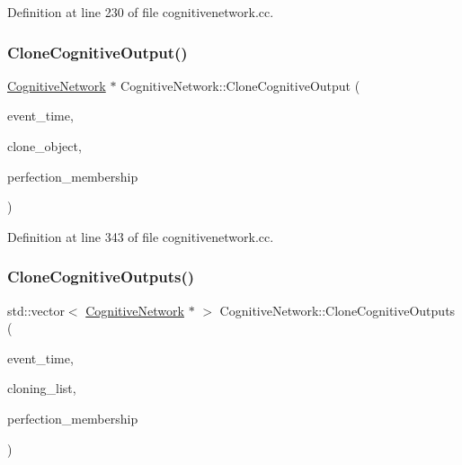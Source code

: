 Definition at line 230 of file cognitivenetwork.\+cc.

\mbox{\label{class_cognitive_network_ab24f74115c11275f365245a4bb826c91}} 
\subsubsection{\texorpdfstring{Clone\+Cognitive\+Output()}{CloneCognitiveOutput()}}
{\footnotesize\ttfamily \mbox{\hyperlink{class_cognitive_network}{Cognitive\+Network}} $\ast$ Cognitive\+Network\+::\+Clone\+Cognitive\+Output (\begin{DoxyParamCaption}\item[{std\+::chrono\+::time\+\_\+point$<$ \mbox{\hyperlink{universe_8h_a0ef8d951d1ca5ab3cfaf7ab4c7a6fd80}{Clock}} $>$}]{event\+\_\+time,  }\item[{\mbox{\hyperlink{class_cognitive_network}{Cognitive\+Network}} $\ast$}]{clone\+\_\+object,  }\item[{double}]{perfection\+\_\+membership }\end{DoxyParamCaption})}



Definition at line 343 of file cognitivenetwork.\+cc.

\mbox{\label{class_cognitive_network_a5734aa5378e9b701dca5e98017c1ea35}} 
\subsubsection{\texorpdfstring{Clone\+Cognitive\+Outputs()}{CloneCognitiveOutputs()}}
{\footnotesize\ttfamily std\+::vector$<$ \mbox{\hyperlink{class_cognitive_network}{Cognitive\+Network}} $\ast$ $>$ Cognitive\+Network\+::\+Clone\+Cognitive\+Outputs (\begin{DoxyParamCaption}\item[{std\+::chrono\+::time\+\_\+point$<$ \mbox{\hyperlink{universe_8h_a0ef8d951d1ca5ab3cfaf7ab4c7a6fd80}{Clock}} $>$}]{event\+\_\+time,  }\item[{std\+::vector$<$ \mbox{\hyperlink{class_cognitive_network}{Cognitive\+Network}} $\ast$$>$}]{cloning\+\_\+list,  }\item[{double}]{perfection\+\_\+membership }\end{DoxyParamCaption})}




